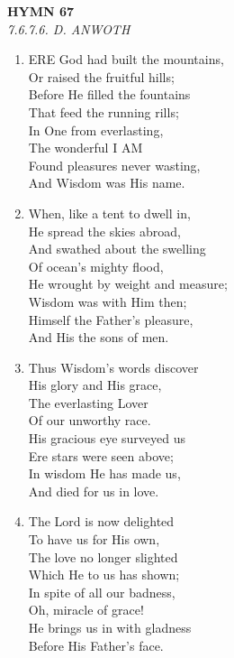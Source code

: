 \documentclass[11pt,a4paper]{article}
\begin{document}
\newpage
\begin{center}
    {\Large \textbf{HYMN 67}}
    \\
    \textit{7.6.7.6. D. ANWOTH}
\end{center}
\vspace{1em}

\begin{enumerate}
    \item ERE God had built the mountains, \\
        Or raised the fruitful hills; \\
        Before He filled the fountains \\
        That feed the running rills; \\
        In One from everlasting, \\
        The wonderful I AM \\
        Found pleasures never wasting, \\
        And Wisdom was His name.

    \item When, like a tent to dwell in, \\
        He spread the skies abroad, \\
        And swathed about the swelling \\
        Of ocean's mighty flood, \\
        He wrought by weight and measure; \\
        Wisdom was with Him then; \\
        Himself the Father's pleasure, \\
        And His the sons of men.

    \item Thus Wisdom's words discover \\
        His glory and His grace, \\
        The everlasting Lover \\
        Of our unworthy race. \\
        His gracious eye surveyed us \\
        Ere stars were seen above; \\
        In wisdom He has made us, \\
        And died for us in love.

    \item The Lord is now delighted \\
        To have us for His own, \\
        The love no longer slighted \\
        Which He to us has shown; \\
        In spite of all our badness, \\
        Oh, miracle of grace! \\
        He brings us in with gladness \\
        Before His Father's face.

\end{enumerate}
\end{document}
